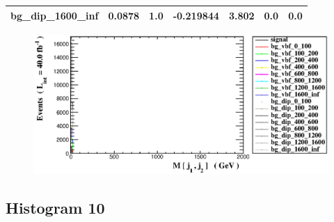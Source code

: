 \documentclass[a4paper, 10pt]{article}
\begin{document}
\begin{table}[H]
\begin{center}
\begin{tabular}{|m{23.0mm}|m{23.0mm}|m{18.0mm}|m{19.0mm}|m{19.0mm}|m{19.0mm}|m{19.0mm}|}
      \hline
      {\cellcolor{white}         bg\_dip\_1600\_inf}& {\cellcolor{white}         0.0878}& {\cellcolor{white}         1.0}& {\cellcolor{white}         -0.219844}& {\cellcolor{white}         3.802}& {\cellcolor{green}         0.0}& {\cellcolor{green}         0.0}\\
\hline
    \end{tabular}
  \end{center}
\end{table}

\begin{figure}[H]
  \begin{center}
    \includegraphics[scale=0.45]{selection_8.eps}\\
\caption{   }
  \end{center}
\end{figure}
      \newpage
\subsection{ Histogram 10}
\end{document}
